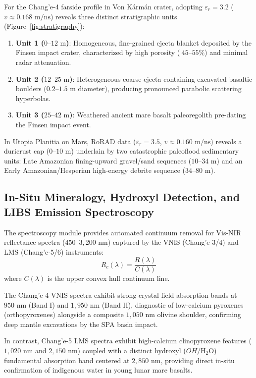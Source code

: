 For the Chang'e-4 farside profile in Von K\'{a}rm\'{a}n crater, adopting $\varepsilon_r = 3.2$ ($v \approx 0.168\text{ m/ns}$) reveals three distinct stratigraphic units (Figure~\ref{fig:stratigraphy}):
\begin{enumerate}
    \item \textbf{Unit 1 ($0\text{--}12\text{ m}$)}: Homogeneous, fine-grained ejecta blanket deposited by the Finsen impact crater, characterized by high porosity ($~45\text{--}55\%$) and minimal radar attenuation.
    \item \textbf{Unit 2 ($12\text{--}25\text{ m}$)}: Heterogeneous coarse ejecta containing excavated basaltic boulders ($0.2\text{--}1.5\text{ m}$ diameter), producing pronounced parabolic scattering hyperbolas.
    \item \textbf{Unit 3 ($25\text{--}42\text{ m}$)}: Weathered ancient mare basalt paleoregolith pre-dating the Finsen impact event.
\end{enumerate}

In Utopia Planitia on Mars, RoRAD data ($\varepsilon_r = 3.5$, $v \approx 0.160\text{ m/ns}$) reveals a duricrust cap ($0\text{--}10\text{ m}$) underlain by two catastrophic paleoflood sedimentary units: Late Amazonian fining-upward gravel/sand sequences ($10\text{--}34\text{ m}$) and an Early Amazonian/Hesperian high-energy debrite sequence ($34\text{--}80\text{ m}$).

\subsection{In-Situ Mineralogy, Hydroxyl Detection, and LIBS Emission Spectroscopy}

The spectroscopy module provides automated continuum removal for Vis-NIR reflectance spectra ($450\text{--}3,200\text{ nm}$) captured by the VNIS (Chang'e-3/4) and LMS (Chang'e-5/6) instruments:
\begin{equation}
    R_c(\lambda) = \frac{R(\lambda)}{C(\lambda)}
    \label{eq:continuum}
\end{equation}
where $C(\lambda)$ is the upper convex hull continuum line.

The Chang'e-4 VNIS spectra exhibit strong crystal field absorption bands at $950\text{ nm}$ (Band I) and $1,950\text{ nm}$ (Band II), diagnostic of low-calcium pyroxenes (orthopyroxenes) alongside a composite $1,050\text{ nm}$ olivine shoulder, confirming deep mantle excavations by the SPA basin impact.

In contrast, Chang'e-5 LMS spectra exhibit high-calcium clinopyroxene features ($1,020\text{ nm}$ and $2,150\text{ nm}$) coupled with a distinct hydroxyl ($OH/\text{H}_2\text{O}$) fundamental absorption band centered at $2,850\text{ nm}$, providing direct in-situ confirmation of indigenous water in young lunar mare basalts.

